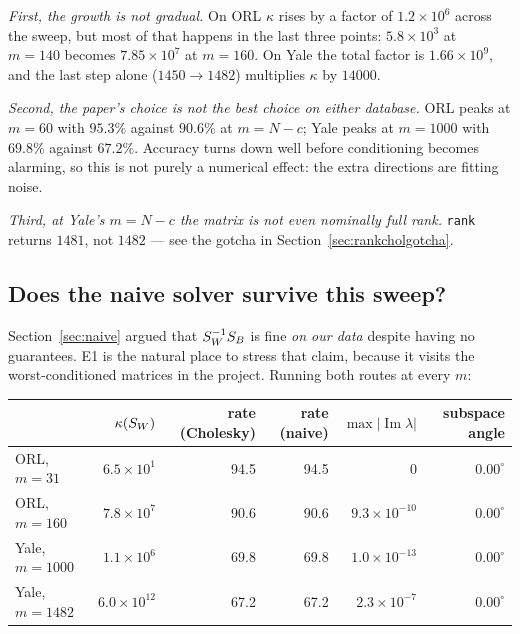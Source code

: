 \begin{observation}
\emph{First, the growth is not gradual.} On ORL $\kappa$ rises by a factor of
$1.2\times10^{6}$ across the sweep, but most of that happens in the last three
points: $5.8\times10^{3}$ at $m=140$ becomes $7.85\times10^{7}$ at $m=160$. On
Yale the total factor is $1.66\times10^{9}$, and the last step alone
($1450 \to 1482$) multiplies $\kappa$ by $14000$.

\emph{Second, the paper's choice is not the best choice on either database.}
ORL peaks at $m=60$ with $95.3\%$ against $90.6\%$ at $m=N-c$; Yale peaks at
$m=1000$ with $69.8\%$ against $67.2\%$. Accuracy turns down well before
conditioning becomes alarming, so this is not purely a numerical effect: the
extra directions are fitting noise.

\emph{Third, at Yale's $m = N - c$ the matrix is not even nominally full rank.}
\texttt{rank} returns $1481$, not $1482$ --- see the gotcha in
Section~\ref{sec:rankcholgotcha}.
\end{observation}

\subsection{Does the naive solver survive this sweep?}
\label{sec:naivesweep}

Section~\ref{sec:naive} argued that $S_W^{-1}S_B$ is fine \emph{on our data}
despite having no guarantees. E1 is the natural place to stress that claim,
because it visits the worst-conditioned matrices in the project. Running both
routes at every $m$:

\begin{center}
\small
\begin{tabular}{lrrrrr}
\toprule
 & $\kappa(S_W)$ & rate (Cholesky) & rate (naive) & $\max|\operatorname{Im}\lambda|$ & subspace angle \\
\midrule
ORL,  $m=31$   & $6.5\times10^{1}$  & 94.5 & 94.5 & $0$                  & $0.00^\circ$ \\
ORL,  $m=160$  & $7.8\times10^{7}$  & 90.6 & 90.6 & $9.3\times10^{-10}$  & $0.00^\circ$ \\
Yale, $m=1000$ & $1.1\times10^{6}$  & 69.8 & 69.8 & $1.0\times10^{-13}$  & $0.00^\circ$ \\
Yale, $m=1482$ & $6.0\times10^{12}$ & 67.2 & 67.2 & $2.3\times10^{-7}$   & $0.00^\circ$ \\
\bottomrule
\end{tabular}
\end{center}


